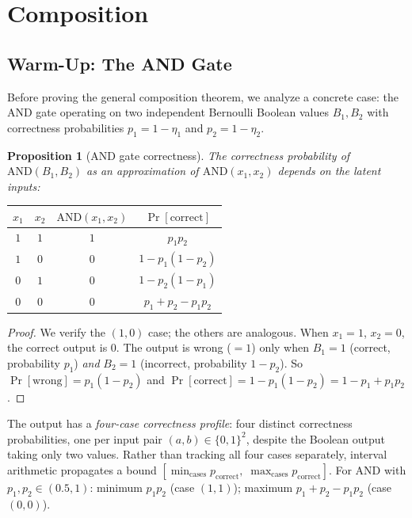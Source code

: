 \documentclass[11pt]{article}
\theoremstyle{definition}
\theoremstyle{plain}
\newtheorem{proposition}[theorem]{Proposition}
\theoremstyle{remark}
\begin{document}
\section{Composition}
\label{sec:composition}

\subsection{Warm-Up: The AND Gate}
\label{subsec:and-gate}

Before proving the general composition theorem, we analyze a concrete case:
the AND gate operating on two independent Bernoulli Boolean values
$B_1, B_2$ with correctness probabilities $p_1 = 1-\eta_1$ and
$p_2 = 1-\eta_2$.

\begin{proposition}[AND gate correctness]
\label{prop:and-gate}
The correctness probability of $\mathrm{AND}(B_1, B_2)$ as an approximation
of $\mathrm{AND}(x_1, x_2)$ depends on the latent inputs:
\begin{center}
\begin{tabular}{@{}cccc@{}}
\toprule
$x_1$ & $x_2$ & $\mathrm{AND}(x_1,x_2)$ & $\Pr[\text{correct}]$ \\
\midrule
$1$ & $1$ & $1$ & $p_1 p_2$ \\
$1$ & $0$ & $0$ & $1 - p_1(1-p_2)$ \\
$0$ & $1$ & $0$ & $1 - p_2(1-p_1)$ \\
$0$ & $0$ & $0$ & $p_1 + p_2 - p_1 p_2$ \\
\bottomrule
\end{tabular}
\end{center}
\end{proposition}

\begin{proof}
We verify the $(1,0)$ case; the others are analogous.  When $x_1=1$,
$x_2=0$, the correct output is $0$.  The output is wrong ($=1$) only when
$B_1=1$ (correct, probability $p_1$) \emph{and} $B_2=1$ (incorrect,
probability $1-p_2$).  So
$\Pr[\text{wrong}] = p_1(1-p_2)$ and
$\Pr[\text{correct}] = 1 - p_1(1-p_2) = 1 - p_1 + p_1 p_2$.
\end{proof}

The output has a \emph{four-case correctness profile}: four distinct
correctness probabilities, one per input pair $(a, b) \in \{0,1\}^2$,
despite the Boolean output taking only two values.  Rather than tracking
all four cases separately, interval arithmetic propagates a bound
$[\min_{\text{cases}} p_{\text{correct}},\; \max_{\text{cases}} p_{\text{correct}}]$.
For AND with $p_1, p_2 \in (0.5, 1)$: minimum $p_1 p_2$ (case $(1,1)$);
maximum $p_1 + p_2 - p_1 p_2$ (case $(0,0)$).
\end{document}
